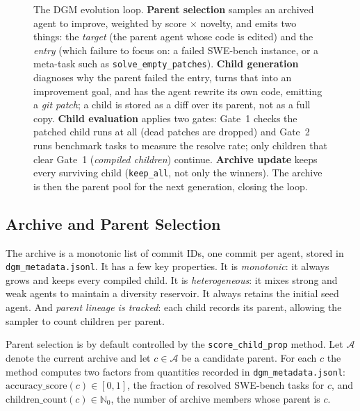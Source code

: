 \begin{figure}[tb]
{%
  }
  \caption{The DGM evolution loop. \textbf{Parent selection} samples an
    archived agent to improve, weighted by score $\times$ novelty, and
    emits two things: the \emph{target} (the parent agent whose code is
    edited) and the \emph{entry} (which failure to focus on: a failed
    SWE-bench instance, or a meta-task such as
    \texttt{solve\_empty\_patches}). \textbf{Child generation} diagnoses
    why the parent failed the entry, turns that into an improvement goal,
    and has the agent rewrite its own code, emitting a \emph{git patch};
    a child is stored as a diff over its parent, not as a full copy.
    \textbf{Child evaluation} applies two gates: Gate~1 checks the patched
    child runs at all (dead patches are dropped) and Gate~2 runs benchmark
    tasks to measure the resolve rate; only children that clear Gate~1
    (\emph{compiled children}) continue. \textbf{Archive update} keeps
    every surviving child (\texttt{keep\_all}, not only the winners). The
    archive is then the parent pool for the next generation, closing the
    loop.}
  \label{fig:dgm-loop}
\end{figure}

\subsection{Archive and Parent Selection}

The archive is a monotonic list of commit IDs, one commit per agent,
stored in \texttt{dgm\_metadata.jsonl}. It has a few key properties.
It is \emph{monotonic}: it always grows and keeps every compiled child.
It is \emph{heterogeneous}: it mixes strong and weak agents to maintain
a diversity reservoir. It always retains the initial seed agent.
And \emph{parent lineage is tracked}: each child records its parent,
allowing the sampler to count children per parent.

Parent selection is by default controlled by the
\texttt{score\_child\_prop} method. Let $\mathcal{A}$ denote the current
archive and let $c \in \mathcal{A}$ be a candidate parent. For each
$c$ the method computes two factors from quantities recorded in
\texttt{dgm\_metadata.jsonl}: $\mathrm{accuracy\_score}(c) \in [0,1]$,
the fraction of resolved SWE-bench tasks for $c$, and
$\mathrm{children\_count}(c) \in \mathbb{N}_0$, the number of archive
members whose parent is $c$.

